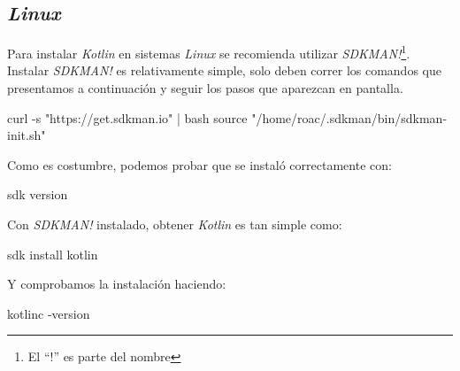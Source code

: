 \subsection{\textit{Linux}}
  Para instalar \textit{Kotlin} en sistemas \textit{Linux} se
  recomienda utilizar \textit{SDKMAN!}\footnote{
    El \enquote{!} es parte del nombre
  }.
  Instalar \textit{SDKMAN!} es relativamente simple, solo deben correr
  los comandos que presentamos a continuación y seguir los pasos
  que aparezcan en pantalla.

  \begin{bash}
    curl -s "https://get.sdkman.io" | bash
    source "/home/roac/.sdkman/bin/sdkman-init.sh"
  \end{bash}

  Como es costumbre, podemos probar que se instaló correctamente con:

  \begin{bash}
    sdk version
  \end{bash}

  Con \textit{SDKMAN!} instalado, obtener \textit{Kotlin} es tan simple como:

  \begin{bash}
    sdk install kotlin
  \end{bash}

  Y comprobamos la instalación haciendo:
  
  \begin{bash}
    kotlinc -version
  \end{bash}